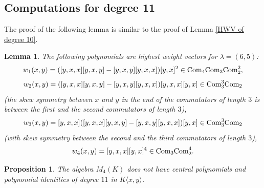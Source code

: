 \documentclass[12pt]{amsart}
\newtheorem{lemma}[theorem]{Lemma}
\newtheorem{proposition}[theorem]{Proposition}
\theoremstyle{definition}
\begin{document}
\subsection{Computations for degree 11}
The proof of the following lemma is similar to the proof of Lemma \ref{HWV of degree 10}.

\begin{lemma}\label{HWV of degree 11}
The following polynomials are highest weight vectors for $\lambda=(6,5)$:
\[
w_1(x,y)=([y,x,x][y,x,y]-[y,x,y][y,x,x])[y,x]^2\in \text{\rm Com}_4\text{\rm Com}_3\text{\rm Com}_2^2,
\]
\[
w_2(x,y)=([y,x,x][y,x,y]-[y,x,y][y,x,x])[y,x,x][y,x]\in \text{\rm Com}_3^3\text{\rm Com}_2
\]
(the skew symmetry between $x$ and $y$ in the end of the commutators of length $3$ is between the first and the second commutators of length $3$),
\[
w_3(x,y)=[y,x,x]([y,x,x][y,x,y]-[y,x,y][y,x,x])[y,x]\in\text{\rm Com}_3^3\text{\rm Com}_2
\]
(with skew symmetry between the second and the third commutators of length $3$),
\[
w_4(x,y)=[y,x,x][y,x]^4\in\text{\rm Com}_3\text{\rm Com}_2^4.
\]
\end{lemma}

\begin{proposition}\label{no central polynomials of degree 11}
The algebra $M_4(K)$ does not have central polynomials and polynomial identities of degree $11$ in $K\langle x,y\rangle$.
\end{proposition}
\end{document}
